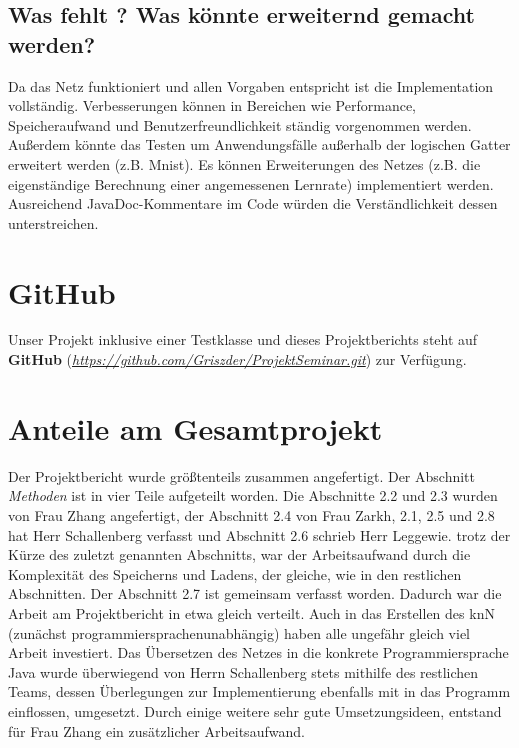 \documentclass[paper=A4,pagesize=auto,12pt,headinclude=true,footinclude=true,BCOR=0mm,DIV=calc]{scrartcl}
\begin{document}
\subsection{Was fehlt ? Was könnte erweiternd gemacht werden?}
Da das Netz funktioniert und allen Vorgaben entspricht ist die Implementation vollständig. Verbesserungen können in Bereichen wie Performance, Speicheraufwand und Benutzerfreundlichkeit ständig vorgenommen werden. Außerdem könnte das Testen um Anwendungsfälle außerhalb der logischen Gatter erweitert werden (z.B. Mnist). Es können Erweiterungen des Netzes (z.B. die eigenständige Berechnung einer angemessenen Lernrate) implementiert werden.
Ausreichend JavaDoc-Kommentare im Code würden die Verständlichkeit dessen unterstreichen.
\newpage

\section{GitHub}
Unser Projekt inklusive einer Testklasse und dieses Projektberichts steht auf \textbf{GitHub} (\hyperref{https://github.com/Griszder/ProjektSeminar.git}{}{}{\textit{https://github.com/Griszder/ProjektSeminar.git}}) zur Verfügung.

\vspace{1cm}

\section{Anteile am Gesamtprojekt}
Der Projektbericht wurde größtenteils zusammen angefertigt. Der Abschnitt \textit{Methoden} ist in vier Teile aufgeteilt worden. Die Abschnitte 2.2 und 2.3 wurden von Frau Zhang angefertigt, der Abschnitt 2.4 von Frau Zarkh, 2.1, 2.5 und 2.8 hat Herr Schallenberg verfasst und Abschnitt 2.6 schrieb Herr Leggewie. trotz der Kürze des zuletzt genannten Abschnitts, war der Arbeitsaufwand durch die Komplexität des Speicherns und Ladens, der gleiche, wie in den restlichen Abschnitten. Der Abschnitt 2.7 ist gemeinsam verfasst worden. Dadurch war die Arbeit am Projektbericht in etwa gleich verteilt. Auch in das Erstellen des knN (zunächst programmiersprachenunabhängig) haben alle ungefähr gleich viel Arbeit investiert. Das Übersetzen des Netzes in die konkrete Programmiersprache Java wurde überwiegend von Herrn Schallenberg stets mithilfe des restlichen Teams, dessen Überlegungen zur Implementierung ebenfalls mit in das Programm einflossen, umgesetzt. Durch einige weitere sehr gute Umsetzungsideen, entstand für Frau Zhang ein zusätzlicher Arbeitsaufwand.

\vspace{1cm}

\printbibliography[heading=bibnumbered]
\end{document}
